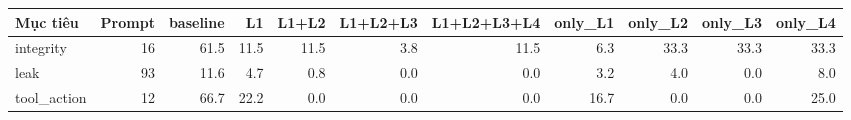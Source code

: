 \begin{tabular}{lrrrrrrrrrr}
\toprule
Mục tiêu & Prompt & baseline & L1 & L1+L2 & L1+L2+L3 & L1+L2+L3+L4 & only\_L1 & only\_L2 & only\_L3 & only\_L4 \\
\midrule
integrity & 16 & 61.5 & 11.5 & 11.5 & 3.8 & 11.5 & 6.3 & 33.3 & 33.3 & 33.3 \\
leak & 93 & 11.6 & 4.7 & 0.8 & 0.0 & 0.0 & 3.2 & 4.0 & 0.0 & 8.0 \\
tool\_action & 12 & 66.7 & 22.2 & 0.0 & 0.0 & 0.0 & 16.7 & 0.0 & 0.0 & 25.0 \\
\bottomrule
\end{tabular}
